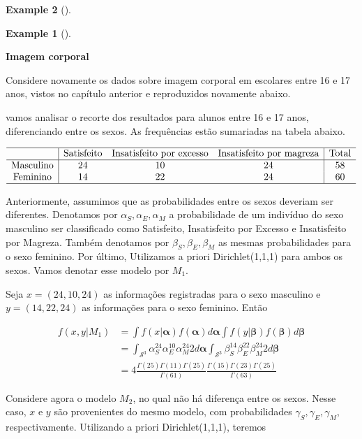 \documentclass[
  letterpaper,
  DIV=11,
  numbers=noendperiod]{scrreprt}
\theoremstyle{definition}
\theoremstyle{plain}
\theoremstyle{definition}
\newtheorem{example}{Example}[chapter]
\theoremstyle{remark}
\begin{document}
\begin{example}[]
\begin{example}[]\protect\hypertarget{exm-}{}\label{exm-}

\textbf{Imagem corporal}

Considere novamente os dados sobre imagem corporal em escolares entre 16
e 17 anos, vistos no capítulo anterior e reproduzidos novamente abaixo.

vamos analisar o recorte dos resultados para alunos entre 16 e 17 anos,
diferenciando entre os sexos. As frequências estão sumariadas na tabela
abaixo.

\[\begin{array}{c|ccc|c}\hline
&\hbox{Satisfeito} & \hbox{Insatisfeito por excesso} & \hbox{Insatisfeito por magreza} &\hbox{Total}\\ \hline
\hbox{Masculino} & 24 & 10 & 24 & 58 \\
\hbox{Feminino} & 14 & 22 & 24 & 60 \\ \hline
\end{array}
\]

Anteriormente, assumimos que as probabilidades entre os sexos deveriam
ser diferentes. Denotamos por \(\alpha_S,\alpha_E,\alpha_M\) a
probabilidade de um indivíduo do sexo masculino ser classificado como
Satisfeito, Insatisfeito por Excesso e Insatisfeito por Magreza. Também
denotamos por \(\beta_S,\beta_E,\beta_M\) as mesmas probabilidades para
o sexo feminino. Por último, Utilizamos a priori Dirichlet(1,1,1) para
ambos os sexos. Vamos denotar esse modelo por \(M_1\).

Seja \(x=(24,10,24)\) as informações registradas para o sexo masculino e
\(y=(14,22,24)\) as informações para o sexo feminino. Então

\[\begin{align}
f(x,y|M_1)&=\int f(x|\boldsymbol{\alpha})f(\boldsymbol{\alpha})d\boldsymbol{\alpha}\int f(y|\boldsymbol{\beta})f(\boldsymbol{\beta})d\boldsymbol{\beta}\\&=
\int_{\mathcal{S}^3} \alpha_S^{24}\alpha_E^{10}\alpha_M^{24}2d\boldsymbol{\alpha}\int_{\mathcal{S}^3} \beta_S^{14}\beta_E^{22}\beta_M^{24}2d\boldsymbol{\beta}\\&=4\frac{\Gamma(25)\Gamma(11)\Gamma(25)}{\Gamma(61)}\frac{\Gamma(15)\Gamma(23)\Gamma(25)}{\Gamma(63)}
\end{align}\]

Considere agora o modelo \(M_2\), no qual não há diferença entre os
sexos. Nesse caso, \(x\) e \(y\) são provenientes do mesmo modelo, com
probabilidades \(\gamma_S,\gamma_E,\gamma_M\), respectivamente.
Utilizando a priori Dirichlet(1,1,1), teremos


\end{example}
\end{example}
\end{document}
